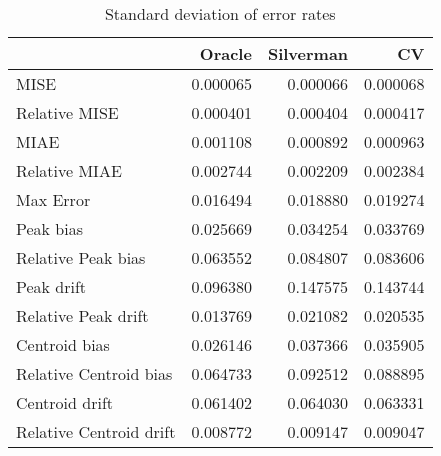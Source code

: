 \begin{table}[ht]
\centering
\begin{tabular}{lrrr}
  \hline
 & Oracle & Silverman & CV \\ 
  \hline
MISE & 0.000065 & 0.000066 & 0.000068 \\ 
  Relative MISE & 0.000401 & 0.000404 & 0.000417 \\ 
  MIAE & 0.001108 & 0.000892 & 0.000963 \\ 
  Relative MIAE & 0.002744 & 0.002209 & 0.002384 \\ 
  Max Error & 0.016494 & 0.018880 & 0.019274 \\ 
  Peak bias & 0.025669 & 0.034254 & 0.033769 \\ 
  Relative Peak bias & 0.063552 & 0.084807 & 0.083606 \\ 
  Peak drift & 0.096380 & 0.147575 & 0.143744 \\ 
  Relative Peak drift & 0.013769 & 0.021082 & 0.020535 \\ 
  Centroid bias & 0.026146 & 0.037366 & 0.035905 \\ 
  Relative Centroid bias & 0.064733 & 0.092512 & 0.088895 \\ 
  Centroid drift & 0.061402 & 0.064030 & 0.063331 \\ 
  Relative Centroid drift & 0.008772 & 0.009147 & 0.009047 \\ 
   \hline
\end{tabular}
\caption{Standard deviation of error rates} 
\label{tbl:stddev_error_rates}
\end{table}
